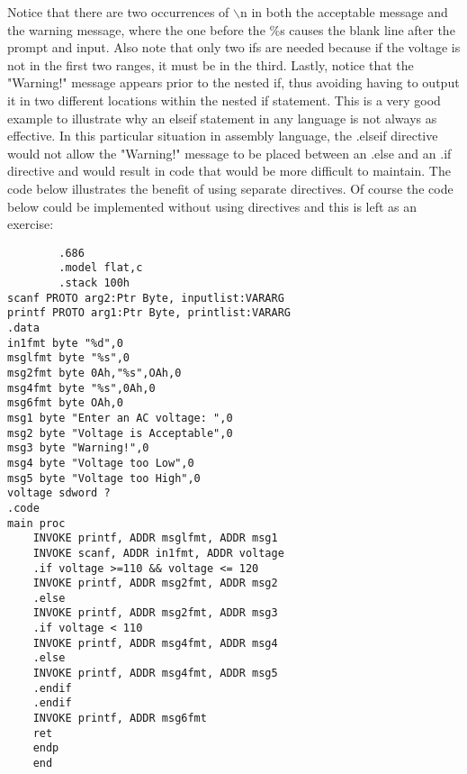 \documentclass[10pt]{article}
\begin{document}
Notice that there are two occurrences of $\backslash \mathrm{n}$ in both the acceptable message and the warning message, where the one before the \%s causes the blank line after the prompt and input. Also note that only two ifs are needed because if the voltage is not in the first two ranges, it must be in the third. Lastly, notice that the "Warning!" message appears prior to the nested if, thus avoiding having to output it in two different locations within the nested if statement. This is a very good example to illustrate why an elseif statement in any language is not always as effective. In this particular situation in assembly language, the .elseif directive would not allow the "Warning!" message to be placed between an .else and an .if directive and would result in code that would be more difficult to maintain. The code below illustrates the benefit of using separate directives. Of course the code below could be implemented without using directives and this is left as an exercise:

\begin{verbatim}
        .686
        .model flat,c
        .stack 100h
scanf PROTO arg2:Ptr Byte, inputlist:VARARG
printf PROTO arg1:Ptr Byte, printlist:VARARG
.data
in1fmt byte "%d",0
msglfmt byte "%s",0
msg2fmt byte 0Ah,"%s",OAh,0
msg4fmt byte "%s",0Ah,0
msg6fmt byte OAh,0
msg1 byte "Enter an AC voltage: ",0
msg2 byte "Voltage is Acceptable",0
msg3 byte "Warning!",0
msg4 byte "Voltage too Low",0
msg5 byte "Voltage too High",0
voltage sdword ?
.code
main proc
    INVOKE printf, ADDR msglfmt, ADDR msg1
    INVOKE scanf, ADDR in1fmt, ADDR voltage
    .if voltage >=110 && voltage <= 120
    INVOKE printf, ADDR msg2fmt, ADDR msg2
    .else
    INVOKE printf, ADDR msg2fmt, ADDR msg3
    .if voltage < 110
    INVOKE printf, ADDR msg4fmt, ADDR msg4
    .else
    INVOKE printf, ADDR msg4fmt, ADDR msg5
    .endif
    .endif
    INVOKE printf, ADDR msg6fmt
    ret
    endp
    end
\end{verbatim}
\end{document}
